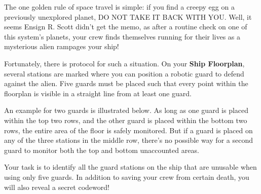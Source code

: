The one golden rule of space travel is simple: if you find a creepy
egg on a previously unexplored planet, DO NOT TAKE IT BACK WITH YOU.
Well, it seems Ensign R. Scott didn't get the memo, as after
a routine check on one of this system's planets, your crew finds
themselves running for their lives as a mysterious alien
rampages your ship!

Fortunately, there is protocol for such a situation. On your
\textbf{Ship Floorplan}, several stations are marked where you
can position a robotic guard to defend against the alien. 
Five guards must be placed such that every point within the floorplan
is visible in a straight line from at least one guard.

An example for two guards is illustrated below. As long as one
guard is placed within the top two rows, and the other guard is
placed within the bottom two rows, the entire area of the floor
is safely monitored. But if a guard is placed on any of the
three stations in the middle row,
there's no possible way for a second guard to monitor both
the top and bottom unaccounted areas.

Your task is to identify all the guard stations on the ship that
are unusable when using only five guards. 
In addition to saving your crew from
certain death, you will also reveal a secret codeword!

\begin{center}

\hspace{0.2in}
\end{center} 
